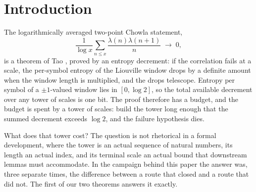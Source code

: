 \documentclass[11pt]{amsart}
\theoremstyle{remark}
\begin{document}
\maketitle

\section{Introduction}\label{sec:intro}

The logarithmically averaged two-point Chowla statement,
\begin{equation}\label{eq:chowla}
\frac{1}{\log x} \sum_{n \le x} \frac{\lambda(n)\lambda(n+1)}{n}
\;\longrightarrow\; 0 ,
\end{equation}
is a theorem of Tao \cite{TaoChowla}, proved by an entropy decrement: if
the correlation fails at a scale, the per-symbol entropy of the Liouville
window drops by a definite amount when the window length is multiplied,
and the drops telescope. Entropy per symbol of a $\pm1$-valued window lies
in $[0, \log 2]$, so the total available decrement over any tower of
scales is one bit. The proof therefore has a budget, and the budget is
spent by a tower of scales: build the tower long enough that the summed
decrement exceeds $\log 2$, and the failure hypothesis dies.

What does that tower cost? The question is not rhetorical in a formal
development, where the tower is an actual sequence of natural numbers, its
length an actual index, and its terminal scale an actual bound that
downstream lemmas must accommodate. In the campaign behind this paper the
answer was, three separate times, the difference between a route that
closed and a route that did not. The first of our two theorems answers it
exactly.
\end{document}
